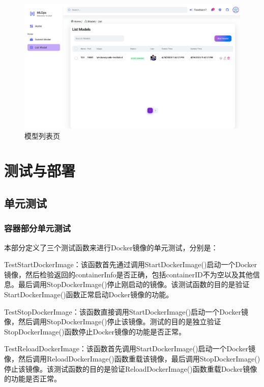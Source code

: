 \documentclass{HDU-Bachelor-Thesis}
\begin{document}
\begin{figure}[H] %
\centering %
\includegraphics[width=1\textwidth]{P-6.png} %
\caption{模型列表页} %
\label{图片.list} %
\end{figure}

\setcounter{table}{0}
\setcounter{figure}{0}
\clearpage
\section{测试与部署}
\subsection{单元测试}
\subsubsection{容器部分单元测试}

本部分定义了三个测试函数来进行Docker镜像的单元测试，分别是：

TestStartDockerImage：该函数首先通过调用StartDockerImage()启动一个Docker镜像，然后检验返回的containerInfo是否正确，包括containerID不为空以及其他信息。最后调用StopDockerImage()停止刚启动的镜像。该测试函数的目的是验证StartDockerImage()函数正常启动Docker镜像的功能。

TestStopDockerImage：该函数直接调用StartDockerImage()启动一个Docker镜像，然后调用StopDockerImage()停止该镜像。测试的目的是独立验证StopDockerImage()函数停止Docker镜像的功能是否正常。

TestReloadDockerImage：该函数首先调用StartDockerImage()启动一个Docker镜像，然后调用ReloadDockerImage()函数重载该镜像，最后调用StopDockerImage()停止该镜像。该测试函数的目的是验证ReloadDockerImage()函数重载Docker镜像的功能是否正常。
\end{document}
